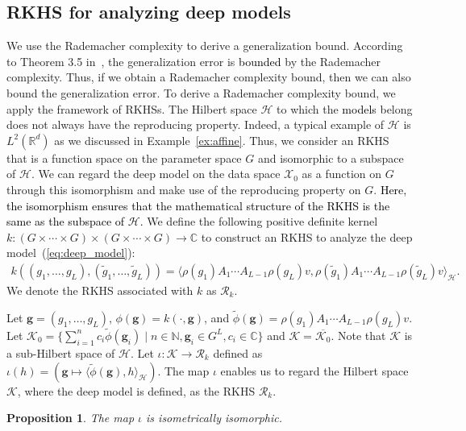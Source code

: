 \documentclass[twoside]{article}
\newtheorem{proposition}{Proposition}
\def\mcl#1{\mathcal{#1}}
\def\hil{\mcl{H}}
\def\red#1{\textcolor{black}{#1}}
\def\eqref#1{(\ref{#1})}
\begin{document}
\subsection{RKHS for analyzing deep models}\label{subsec:rkhs_deep}
We use the Rademacher complexity to derive a generalization bound.
According to Theorem 3.5 in~\citet{mohri18}, the generalization error is \red{bounded} by the Rademacher complexity.
Thus, if we obtain a Rademacher complexity bound, then we can also bound the generalization error.
To derive a Rademacher complexity bound, we apply the framework of RKHSs.
The Hilbert space $\hil$ to which the \red{models} belong does not always have the reproducing property.
Indeed, a typical example of $\hil$ is $L^2(\mathbb{R}^d)$ as we discussed in Example~\ref{ex:affine}.
Thus, we consider an RKHS that is a function space on the parameter space $G$ and isomorphic to a subspace of $\hil$.
We can regard the deep model on the data space $\mcl{X}_0$ as a function on $G$ through this isomorphism and make use of the reproducing property on $G$.
\red{Here, the isomorphism ensures that the mathematical structure of the RKHS is the same as the subspace of $\hil$.}
We define the following positive definite kernel $k: (G \times \cdots \times G) \times (G \times \cdots \times G) \to \mathbb{C}$ to construct an RKHS to analyze the deep model~\eqref{eq:deep_model}:
\begin{align*}
k((g_1, \ldots, g_L), (\tilde{g}_1, \ldots, \tilde{g}_L)) = \langle \rho(g_1) A_1 \cdots A_{L-1} \rho(g_L) v, \rho(\tilde{g}_1) A_1 \cdots A_{L-1} \rho(\tilde{g}_L) v \rangle_\mathcal{H}.
\end{align*}
We denote the RKHS associated with $k$ as $\mcl{R}_k$.

Let $\mathbf{g}=(g_1,\ldots,g_L)$, $\phi(\mathbf{g})=k(\cdot,\mathbf{g})$, and $\tilde{\phi}(\mathbf{g})=\rho(g_1) A_1 \cdots A_{L-1} \rho(g_L) v$.
Let $\mcl{K}_0=\{\sum_{i=1}^n c_i \tilde{\phi}(\mathbf{g}_i) \mid n \in \mathbb{N}, \mathbf{g}_i \in G^L, c_i \in \mathbb{C}\}$ and $\mcl{K}=\overline{\mcl{K}_0}$.
Note that $\mcl{K}$ is a sub-Hilbert space of $\hil$.
Let $\iota:\mcl{K}\to \mcl{R}_k$ defined as $\iota(h)=(\mathbf{g}\mapsto \langle  \tilde{\phi}(\mathbf{g}), h \rangle_\mathcal{H})$.
The map $\iota$ enables us to regard the Hilbert space $\mcl{K}$, where the deep model is defined, as the RKHS $\mcl{R}_k$. 
\begin{proposition}\label{prop:isomorphism}
The map $\iota$ is isometrically isomorphic.
\end{proposition}
\end{document}
